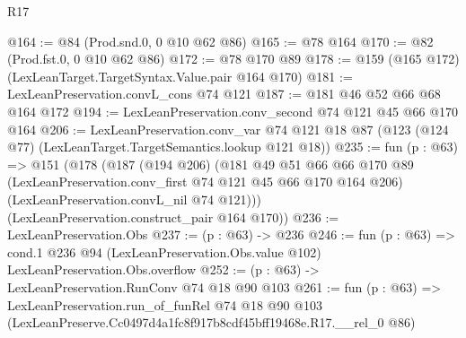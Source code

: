 \begin{lexlean}{R17}
\begin{coremodule}
@164 := @84 (Prod.snd.{0, 0} @10 @62 @86)
@165 := @78 @164
@170 := @82 (Prod.fst.{0, 0} @10 @62 @86)
@172 := @78 @170 @89
@178 := @159 (@165 @172) (LexLeanTarget.TargetSyntax.Value.pair @164 @170)
@181 := LexLeanPreservation.convL_cons @74 @121
@187 := @181 @46 @52 @66 @68 @164 @172
@194 := LexLeanPreservation.conv_second @74 @121 @45 @66 @170 @164
@206 := LexLeanPreservation.conv_var
    @74
    @121
    @18
    @87
    (@123 (@124 @77) (LexLeanTarget.TargetSemantics.lookup @121 @18))
@235 := fun (p : @63) =>
  @151
    (@178
      (@187
        (@194 @206)
        (@181
          @49
          @51
          @66
          @66
          @170
          @89
          (LexLeanPreservation.conv_first @74 @121 @45 @66 @170 @164 @206)
          (LexLeanPreservation.convL_nil @74 @121)))
      (LexLeanPreservation.construct_pair @164 @170))
@236 := LexLeanPreservation.Obs
@237 := (p : @63) -> @236
@246 := fun (p : @63) =>
  cond.{1} @236 @94 (LexLeanPreservation.Obs.value @102) LexLeanPreservation.Obs.overflow
@252 := (p : @63) -> LexLeanPreservation.RunConv @74 @18 @90 @103
@261 := fun (p : @63) =>
  LexLeanPreservation.run_of_funRel
    @74
    @18
    @90
    @103
    (LexLeanPreserve.Cc0497d4a1fc8f917b8cdf45bff19468e.R17.__rel_0 @86)
\end{coremodule}
\end{lexlean}
